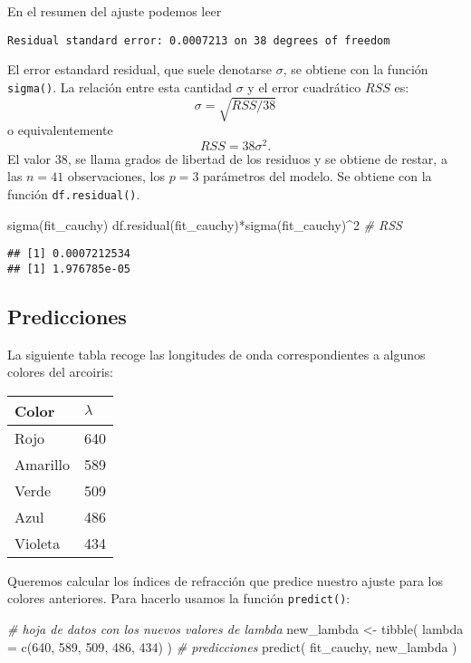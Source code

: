 \documentclass[
  degree=mecinf,
  title=normal,
  toc=normal,
  bib=normal]{mnye}
\newenvironment{Shaded}{\begin{snugshade}}{\end{snugshade}}
\newcommand{\AttributeTok}[1]{\textcolor[rgb]{0.77,0.63,0.00}{#1}}
\newcommand{\CommentTok}[1]{\textcolor[rgb]{0.56,0.35,0.01}{\textit{#1}}}
\newcommand{\DecValTok}[1]{\textcolor[rgb]{0.00,0.00,0.81}{#1}}
\newcommand{\FunctionTok}[1]{\textcolor[rgb]{0.00,0.00,0.00}{#1}}
\newcommand{\NormalTok}[1]{#1}
\newcommand{\OtherTok}[1]{\textcolor[rgb]{0.56,0.35,0.01}{#1}}
\newcommand{\SpecialCharTok}[1]{\textcolor[rgb]{0.00,0.00,0.00}{#1}}
\begin{document}
En el resumen del ajuste podemos leer

\texttt{Residual\ standard\ error:\ 0.0007213\ on\ 38\ degrees\ of\ freedom}

El error estandard residual, que suele denotarse \(\sigma\), se obtiene con la función \texttt{sigma()}. La relación entre esta cantidad \(\sigma\) y el error cuadrático \(RSS\) es:
\[\sigma = \sqrt{RSS/38}\]
o equivalentemente
\[RSS=38\sigma^2.\]
El valor \(38\), se llama grados de libertad de los residuos y se obtiene de restar, a las \(n=41\) observaciones, los \(p=3\) parámetros del modelo. Se obtiene con la función \texttt{df.residual()}.

\begin{Shaded}
\begin{Highlighting}[]
\FunctionTok{sigma}\NormalTok{(fit\_cauchy)}
\FunctionTok{df.residual}\NormalTok{(fit\_cauchy)}\SpecialCharTok{*}\FunctionTok{sigma}\NormalTok{(fit\_cauchy)}\SpecialCharTok{\^{}}\DecValTok{2} \CommentTok{\# RSS}
\end{Highlighting}
\end{Shaded}

\begin{verbatim}
## [1] 0.0007212534
## [1] 1.976785e-05
\end{verbatim}

\hypertarget{predicciones}{%
\subsection{Predicciones}\label{predicciones}}

La siguiente tabla recoge las longitudes de onda correspondientes a algunos colores del arcoiris:

\begin{longtable}[]{@{}ll@{}}
\toprule
Color & \(\lambda\) \\
\midrule
\endhead
Rojo & 640 \\
Amarillo & 589 \\
Verde & 509 \\
Azul & 486 \\
Violeta & 434 \\
\bottomrule
\end{longtable}

Queremos calcular los índices de refracción que predice nuestro ajuste para los colores anteriores. Para hacerlo usamos la función \texttt{predict()}:

\begin{Shaded}
\begin{Highlighting}[]
\CommentTok{\# hoja de datos con los nuevos valores de lambda}
\NormalTok{new\_lambda }\OtherTok{\textless{}{-}} \FunctionTok{tibble}\NormalTok{( }
        \AttributeTok{lambda =} \FunctionTok{c}\NormalTok{(}\DecValTok{640}\NormalTok{, }\DecValTok{589}\NormalTok{, }\DecValTok{509}\NormalTok{, }\DecValTok{486}\NormalTok{, }\DecValTok{434}\NormalTok{)}
\NormalTok{    )}
\CommentTok{\# predicciones}
\FunctionTok{predict}\NormalTok{(}
\NormalTok{    fit\_cauchy,}
\NormalTok{    new\_lambda}
\NormalTok{)}
\end{Highlighting}
\end{Shaded}
\end{document}
